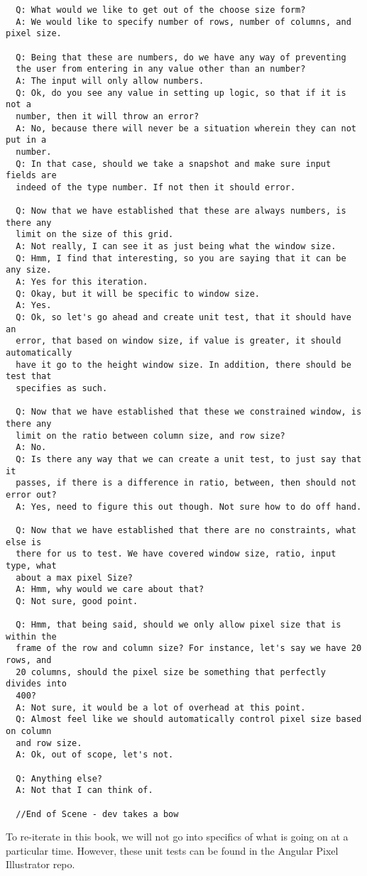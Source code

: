 \begin{verbatim}
  Q: What would we like to get out of the choose size form?
  A: We would like to specify number of rows, number of columns, and pixel size.

  Q: Being that these are numbers, do we have any way of preventing
  the user from entering in any value other than an number?
  A: The input will only allow numbers.
  Q: Ok, do you see any value in setting up logic, so that if it is not a
  number, then it will throw an error?
  A: No, because there will never be a situation wherein they can not put in a
  number.
  Q: In that case, should we take a snapshot and make sure input fields are
  indeed of the type number. If not then it should error.

  Q: Now that we have established that these are always numbers, is there any
  limit on the size of this grid.
  A: Not really, I can see it as just being what the window size.
  Q: Hmm, I find that interesting, so you are saying that it can be any size.
  A: Yes for this iteration.
  Q: Okay, but it will be specific to window size.
  A: Yes.
  Q: Ok, so let's go ahead and create unit test, that it should have an
  error, that based on window size, if value is greater, it should automatically
  have it go to the height window size. In addition, there should be test that
  specifies as such.

  Q: Now that we have established that these we constrained window, is there any
  limit on the ratio between column size, and row size?
  A: No.
  Q: Is there any way that we can create a unit test, to just say that it
  passes, if there is a difference in ratio, between, then should not error out?
  A: Yes, need to figure this out though. Not sure how to do off hand.

  Q: Now that we have established that there are no constraints, what else is
  there for us to test. We have covered window size, ratio, input type, what
  about a max pixel Size?
  A: Hmm, why would we care about that?
  Q: Not sure, good point.

  Q: Hmm, that being said, should we only allow pixel size that is within the
  frame of the row and column size? For instance, let's say we have 20 rows, and
  20 columns, should the pixel size be something that perfectly divides into
  400?
  A: Not sure, it would be a lot of overhead at this point.
  Q: Almost feel like we should automatically control pixel size based on column
  and row size.
  A: Ok, out of scope, let's not.

  Q: Anything else?
  A: Not that I can think of.

  //End of Scene - dev takes a bow
\end{verbatim}

To re-iterate in this book, we will not go into specifics of what is going on
at a particular time. However, these unit tests can be found in the Angular
Pixel Illustrator repo.
